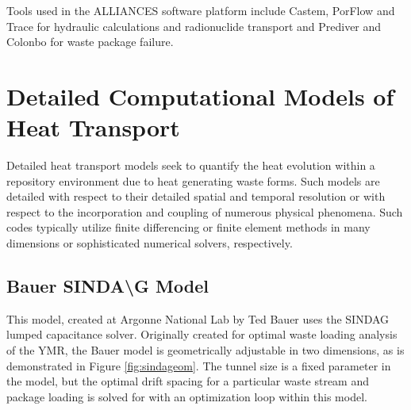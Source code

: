 {Tools used in the ALLIANCES software platform include Castem, PorFlow and Trace
for hydraulic calculations and radionuclide transport and Prediver and Colonbo for
waste package failure.






\section{Detailed Computational Models of Heat Transport}
\label{sec:detailed_heat}


Detailed heat transport models seek to quantify the heat evolution within a 
repository environment due to heat generating waste forms. Such models are 
detailed with respect to their detailed spatial and temporal resolution or 
with respect to the incorporation and coupling of numerous physical phenomena. 
Such codes typically utilize finite differencing or finite element methods in 
many dimensions or sophisticated numerical solvers, respectively. 



\subsection{Bauer SINDA{\textbackslash}G Model}

This model, created at Argonne National Lab by Ted Bauer uses the \gls{SINDAG} 
lumped capacitance solver. Originally created for optimal waste loading analysis 
of the \gls{YMR}, the Bauer model is geometrically adjustable in two dimensions,   
as is demonstrated in Figure \ref{fig:sindageom}. The tunnel size is a fixed 
parameter in the model, but the optimal drift spacing for a particular waste 
stream and package loading is solved for with an optimization loop within this 
model.

}
